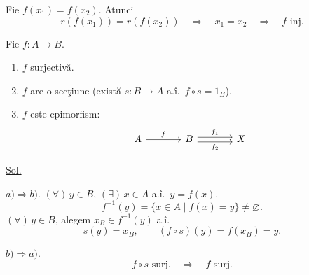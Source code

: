 \medskip
\noindent{}\quad
Fie $f(x_1)=f(x_2)$. Atunci
\[
r(f(x_1))=r(f(x_2))
\quad\Longrightarrow\quad x_1=x_2
\quad\Longrightarrow\quad f\text{ inj.}
\]

\medskip
\noindent{}\quad Fie $f:A\longrightarrow B$.
\begin{enumerate}
\item[a)] $f$ surjectivă.
\item[b)] $f$ are o secţiune (există $s:B\longrightarrow A$ a.î.\ $f\circ s=1_B$).
\item[c)] $f$ este epimorfism:
\[
\begin{tikzcd}[column sep=large]
A \arrow[r,"f"] & B
\arrow[r,shift left=.55ex,"f_1"]
\arrow[r,shift right=.55ex,"f_2"'] & X
\end{tikzcd}
\]
\end{enumerate}

\noindent\underline{Sol.}

\noindent $a)\Rightarrow b)$.
\noindent $(\forall)\,y\in B$, $(\exists)\,x\in A$ a.î.\ $y=f(x)$.
\[
f^{-1}(y)=\{x\in A\mid f(x)=y\}\neq\varnothing.
\]
\noindent $(\forall)\,y\in B$, alegem $x_B\in f^{-1}(y)$ a.î.
\[
s(y)=x_B,\qquad (f\circ s)(y)=f(x_B)=y.
\]

\medskip
\noindent $b)\Rightarrow a)$.
\[
f\circ s\text{ surj.}\quad\Longrightarrow\quad f\text{ surj.}
\]

